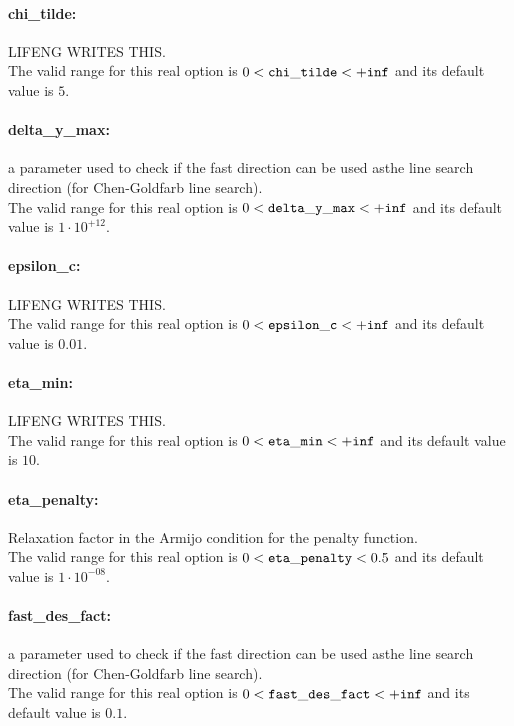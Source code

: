 \paragraph{chi\_tilde:}\label{sec:chi_tilde} LIFENG WRITES THIS. $\;$ \\
 The valid range for this real option is 
$0 <  {\tt chi\_tilde } <  {\tt +inf}$
and its default value is $5$.


\paragraph{delta\_y\_max:}\label{sec:delta_y_max} a parameter used to check if the fast direction can be used asthe line search direction (for Chen-Goldfarb line search). $\;$ \\
 The valid range for this real option is 
$0 <  {\tt delta\_y\_max } <  {\tt +inf}$
and its default value is $1 \cdot 10^{+12}$.


\paragraph{epsilon\_c:}\label{sec:epsilon_c} LIFENG WRITES THIS. $\;$ \\
 The valid range for this real option is 
$0 <  {\tt epsilon\_c } <  {\tt +inf}$
and its default value is $0.01$.


\paragraph{eta\_min:}\label{sec:eta_min} LIFENG WRITES THIS. $\;$ \\
 The valid range for this real option is 
$0 <  {\tt eta\_min } <  {\tt +inf}$
and its default value is $10$.


\paragraph{eta\_penalty:}\label{sec:eta_penalty} Relaxation factor in the Armijo condition for the penalty function. $\;$ \\
 The valid range for this real option is 
$0 <  {\tt eta\_penalty } <  0.5$
and its default value is $1 \cdot 10^{-08}$.


\paragraph{fast\_des\_fact:}\label{sec:fast_des_fact} a parameter used to check if the fast direction can be used asthe line search direction (for Chen-Goldfarb line search). $\;$ \\
 The valid range for this real option is 
$0 <  {\tt fast\_des\_fact } <  {\tt +inf}$
and its default value is $0.1$.



